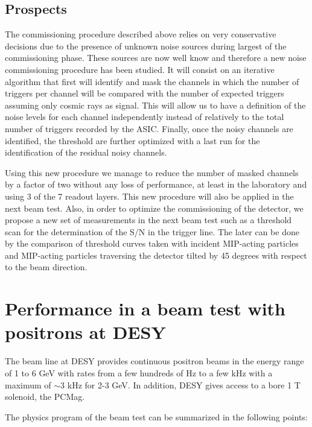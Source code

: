 \documentclass[a4paper,11pt]{article}
\begin{document}
\subsection{Prospects}
\label{sec:comm_prospects}

The commissioning procedure described above relies on very conservative decisions
due to the presence of unknown noise sources during largest of the commissioning phase.
These sources are
now well know and therefore a new noise commissioning procedure has been studied.
It will consist on an iterative algorithm that first
will identify and mask the channels
in which the number of triggers per channel will be compared with the number of expected triggers
assuming only cosmic rays as signal. This will allow us to have a
definition of the noise levels for each channel independently
instead of relatively to the total number of triggers recorded by
the ASIC. Finally, once the noisy channels
are identified, the threshold  are further optimized
with a last run for the identification of the residual noisy channels.

Using this new procedure we manage to reduce the number of masked channels by a factor of two
without any loss of performance, at least in the laboratory and using 3 of the 7 readout layers.
This new procedure will also be applied in the next beam test.
Also, in order to
optimize the commissioning of the detector,
we propose a new set of measurements in the next beam test such as
a threshold scan for the determination of the S/N in the trigger line. The later
can be done by the comparison of threshold curves taken with incident MIP-acting particles
and MIP-acting particles traversing the detector tilted by 45 degrees with respect to the beam direction.


\section{Performance in a beam test with positrons at DESY}
\label{sec:beamtest}


The beam line at DESY provides continuous positron beams in the energy range of 1 to 6 GeV with
rates from a few hundreds of Hz to a few kHz with a maximum of $\sim 3$ kHz for 2-3 GeV. 
In addition, DESY gives access to a bore 1 T solenoid, the PCMag.

The physics program of the beam test can be summarized in the following points:
\end{document}
